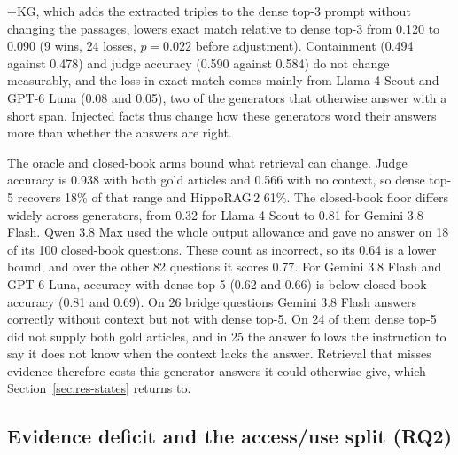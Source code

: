 \documentclass[preprint,12pt]{elsarticle}
\begin{document}
+KG, which adds the extracted triples to the dense top-3 prompt without
changing the passages, lowers exact match relative to dense top-3 from 0.120 to
0.090 (9 wins, 24 losses, $p=0.022$ before adjustment). Containment (0.494
against 0.478) and judge accuracy (0.590 against 0.584) do not change
measurably, and the loss in exact match comes mainly from Llama 4 Scout and
GPT-6 Luna (0.08 and 0.05), two of the generators that otherwise answer with a
short span. Injected facts thus
change how these generators word their answers more than whether the answers
are right.

The oracle and closed-book arms bound what retrieval can change. Judge accuracy
is 0.938 with both gold articles and 0.566 with no context, so dense top-5
recovers 18\% of that range and HippoRAG\,2 61\%. The closed-book floor differs
widely across generators, from 0.32 for Llama 4 Scout to 0.81 for Gemini 3.8
Flash. Qwen 3.8 Max used the whole output allowance and gave no answer on 18 of
its 100 closed-book questions. These count as incorrect, so its 0.64 is a lower
bound, and over the other 82 questions it scores 0.77. For Gemini 3.8 Flash and
GPT-6 Luna, accuracy with dense top-5 (0.62 and 0.66) is below closed-book
accuracy (0.81 and 0.69). On 26
bridge questions Gemini 3.8 Flash answers correctly without context but not
with dense top-5. On 24 of them dense top-5 did not supply both gold articles,
and in 25 the answer follows the instruction to say it does not know when the
context lacks the answer. Retrieval that misses evidence therefore costs this
generator answers it could otherwise give, which Section~\ref{sec:res-states}
returns to.

\subsection{Evidence deficit and the access/use split (RQ2)}
\label{sec:res-deficit}
\end{document}
